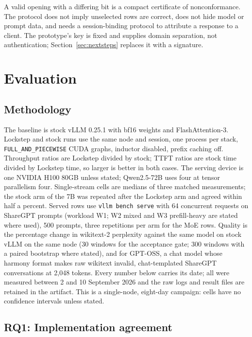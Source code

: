 \documentclass{article}
\begin{document}
A valid opening with a differing bit is a compact certificate of nonconformance.  The
protocol does not imply unselected rows are correct, does not hide model or prompt data, and
needs a session-binding protocol to attribute a response to a client.  The prototype's key is
fixed and supplies domain separation, not authentication; Section~\ref{sec:nextsteps}
replaces it with a signature.

\section{Evaluation}
\label{sec:evaluation}

\subsection{Methodology}

The baseline is stock vLLM 0.25.1 with bf16 weights and FlashAttention-3.  Lockstep and stock
runs use the same node and session, one process per stack, \texttt{FULL\_AND\_PIECEWISE}
CUDA graphs, inductor disabled, prefix caching off.  Throughput ratios are Lockstep divided by
stock; TTFT ratios are stock time divided by Lockstep time, so larger is better in both cases.
The serving device is one NVIDIA H100 80GB unless stated; Qwen2.5-72B uses four at tensor
parallelism four.  Single-stream cells are medians of three matched measurements; the stock
arm of the 7B was repeated after the Lockstep arm and agreed within half a percent.  Served
rows use \texttt{vllm bench serve} with 64 concurrent requests on ShareGPT prompts
(workload W1; W2 mixed and W3 prefill-heavy are stated where used), 500 prompts, three
repetitions per arm for the MoE rows.  Quality is the percentage change in wikitext-2
perplexity against the same model on stock vLLM on the same node (30 windows for the
acceptance gate; 300 windows with a paired bootstrap where stated), and for GPT-OSS, a chat
model whose harmony format makes raw wikitext invalid, chat-templated ShareGPT conversations
at 2,048 tokens.  Every number below carries its date; all were measured between 2 and 10
September 2026 and the raw logs and result files are retained in the artifact.  This is a
single-node, eight-day campaign: cells have no confidence intervals unless stated.

\subsection{RQ1: Implementation agreement}
\end{document}
